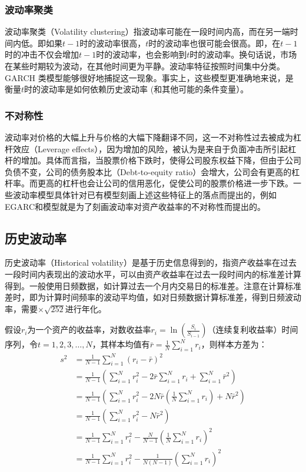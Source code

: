\documentclass[11pt]{article}
\begin{document}
\subsubsection{波动率聚类}

波动率聚类（Volatility clustering）指波动率可能在一段时间内高，而在另一端时间内低。即如果$t−1$时的波动率很高，$t$时的波动率也很可能会很高。即，在$t−1$时的冲击不仅会增加$t−1$时的波动率，也会影响到$t$时的波动率。换句话说，市场在某些时期较为波动，在其他时间更为平静。波动率特征按照时间集中分类。GARCH 类模型能够很好地捕捉这一现象。事实上，这些模型更准确地来说，是衡量$t$时的波动率是如何依赖历史波动率 (和其他可能的条件变量）。

\subsubsection{不对称性}

波动率对价格的大幅上升与价格的大幅下降翻译不同，这一不对称性过去被成为杠杆效应（Leverage effects），因为增加的风险，被认为是来自于负面冲击所引起杠杆的增加。具体而言指，当股票价格下跌时，使得公司股东权益下降，但由于公司负债不变，公司的债务股本比（Debt-to-equity ratio）会增大，公司会有更高的杠杆率。而更高的杠杆也会让公司的信用恶化，促使公司的股票价格进一步下跌。一些波动率模型具体针对已有模型刻画上述这些特征上的落点而提出的，例如EGARC和模型就是为了刻画波动率对资产收益率的不对称性而提出的。

\subsection{历史波动率}

历史波动率（Historical volatility）是基于历史信息得到的，指资产收益率在过去一段时间内表现出的波动水平，可以由资产收益率在过去一段时间内的标准差计算得到。一般使用日频数据，如计算过去一个月内交易日的标准差。注意在计算标准差时，即为计算时间频率的波动平均值，如对日频数据计算标准差，得到日频波动率，需要$\times \sqrt{252}$进行年化。

假设$r_i$为一个资产的收益率，对数收益率$r_i = \ln \left( \frac{S_i}{S_{i-1}} \right)$（连续复利收益率）时间序列，令$t=1,2,3,\dots,N$，其样本均值有$\bar{r} = \frac{1}{N} \sum_{i=1}^{N}r_i$，则样本方差为：
\begin{align*}
    s^2 &= \frac{1}{N-1} \sum^N_{i=1} (r_i - \bar{r})^2 \\
    &= \frac{1}{N-1} \left( \sum^N_{i=1} r_i^2 - 2\bar{r} \sum^N_{i=1} r_i + \sum^N_{i=1} \bar{r}^2 \right) \\
    &= \frac{1}{N-1} \left( \sum^N_{i=1} r_i^2 - 2N\bar{r}\left(\frac{1}{N} \sum^N_{i=1} r_i \right) + N \bar{r}^2 \right) \\
    &= \frac{1}{N-1} \left( \sum^N_{i=1} r_i^2 - N \bar{r}^2 \right) \\
    &= \frac{1}{N-1} \sum^N_{i=1} r_i^2 - \frac{N}{N-1} \left( \frac{1}{N}  \sum^N_{i=1} r_i \right)^2 \\
    &= \frac{1}{N-1} \sum^N_{i=1} r_i^2 - \frac{1}{N(N-1)} \left( \sum^N_{i=1} r_i \right)^2
\end{align*}
\end{document}
